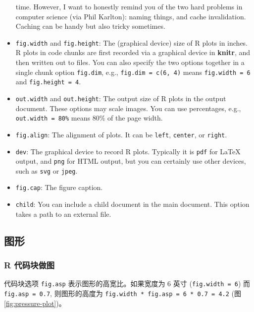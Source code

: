 \documentclass[]{article}
\begin{document}
\begin{itemize}
  time. However, I want to honestly remind you of the two hard problems
  in computer science (via Phil Karlton): naming things, and cache
  invalidation. Caching can be handy but also tricky sometimes.
\item
  \texttt{fig.width} and \texttt{fig.height}: The (graphical device)
  size of R plots in inches. R plots in code chunks are first recorded
  via a graphical device in \textbf{knitr}, and then written out to
  files. You can also specify the two options together in a single chunk
  option \texttt{fig.dim}, e.g., \texttt{fig.dim\ =\ c(6,\ 4)} means
  \texttt{fig.width\ =\ 6} and \texttt{fig.height\ =\ 4}.
\item
  \texttt{out.width} and \texttt{out.height}: The output size of R plots
  in the output document. These options may scale images. You can use
  percentages, e.g.,
  \texttt{out.width\ =\ \textquotesingle{}80\%\textquotesingle{}} means
  80\% of the page width.
\item
  \texttt{fig.align}: The alignment of plots. It can be
  \texttt{\textquotesingle{}left\textquotesingle{}}, \texttt{center}, or
  \texttt{\textquotesingle{}right\textquotesingle{}}.
\item
  \texttt{dev}: The graphical device to record R plots. Typically it is
  \texttt{\textquotesingle{}pdf\textquotesingle{}} for LaTeX output, and
  \texttt{\textquotesingle{}png\textquotesingle{}} for HTML output, but
  you can certainly use other devices, such as
  \texttt{\textquotesingle{}svg\textquotesingle{}} or
  \texttt{\textquotesingle{}jpeg\textquotesingle{}}.
\item
  \texttt{fig.cap}: The figure caption.
\item
  \texttt{child}: You can include a child document in the main document.
  This option takes a path to an external file.
\end{itemize}

\subsection{图形}

\hypertarget{r-}{%
\subsubsection{R 代码块做图}\label{r-}}

代码块选项 \texttt{fig.asp} 表示图形的高宽比。如果宽度为 6 英寸
(\texttt{fig.width\ =\ 6}) 而 \texttt{fig.asp\ =\ 0.7}, 则图形的高度为
\texttt{fig.width\ *\ fig.asp\ =\ 6\ *\ 0.7\ =\ 4.2}
(图\ref{fig:pressure-plot})。
\end{document}
